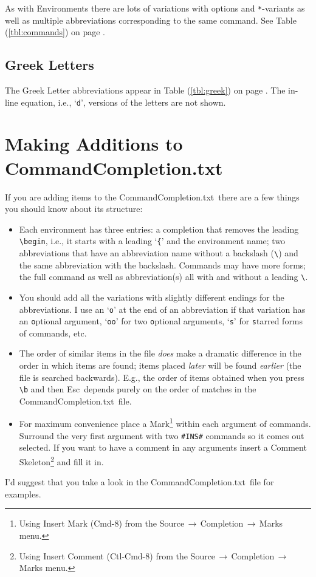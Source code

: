 \documentclass[11pt]{article}
\newcommand{\ctlkey}{\textsf{Ctl}}
\newcommand{\cmdkey}{\textsf{Cmd}}
\newcommand{\esckey}{\textsf{Esc}}
\newcommand{\mnu}[1]{\textsf{#1}}
\newcommand{\To}{\,\(\to\)\,}
\newcommand{\CCT}{\textsf{CommandCompletion.txt}}
\begin{document}
As with Environments there are lots of variations with options and \texttt{*}-variants as well as multiple abbreviations corresponding to the same command. See Table (\ref{tbl:commands}) on page \pageref{tbl:commands}.

\subsection*{Greek Letters}

The Greek Letter abbreviations appear in Table (\ref{tbl:greek}) on page \pageref{tbl:greek}. The in-line equation, i.e., `\texttt{d}', versions of the letters are not shown.

\section*{Making Additions to \CCT}

If you are adding items to the \CCT\ there are a few things you should know about its structure:
\begin{itemize}
\item
Each environment has three entries: a completion that removes the leading \verb|\begin|, i.e., it starts with a leading `\texttt{\{}' and the environment name; two abbreviations that have an abbreviation name without a backslash (\verb|\|) and the same abbreviation with the backslash. Commands may have more forms; the full command as well as abbreviation(s) all with and without a leading \verb|\|.
\item
You should add all the variations with slightly different endings for the abbreviations. I use an `\texttt{o}' at the end of an abbreviation if that variation has an \texttt{o}ptional argument, `\texttt{oo}' for two \texttt{o}ptional arguments, `\texttt{s}' for \texttt{s}tarred forms of commands, etc.
\item
The order of similar items in the file \emph{does} make a dramatic difference in the order in which items are found; items placed \emph{later} will be found \emph{earlier} (the file is searched backwards). E.g., the order of items obtained when you press \verb|\b| and then \esckey\ depends purely on the order of matches in the \CCT\ file.
\item
For maximum convenience place a Mark\footnote{Using \mnu{Insert Mark} (\cmdkey-\textsf{8}) from the \mnu{Source}\To\mnu{Completion}\To\mnu{Marks} menu.} within each argument of commands. Surround the very first argument with two \verb|#INS#| commands so it comes out selected. If you want to have a comment in any arguments insert a Comment Skeleton\footnote{Using \mnu{Insert Comment} (\ctlkey-\cmdkey-\textsf{8}) from the \mnu{Source}\To\mnu{Completion}\To\mnu{Marks} menu.} and fill it in.
\end{itemize}
I'd suggest that you take a look in the \CCT\ file for examples.
\end{document}
